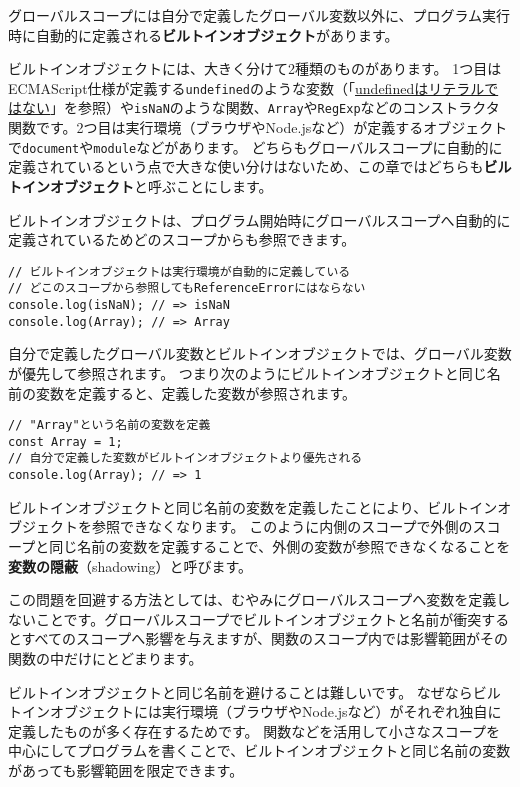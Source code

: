 グローバルスコープには自分で定義したグローバル変数以外に、プログラム実行時に自動的に定義される\textbf{ビルトインオブジェクト}があります。

ビルトインオブジェクトには、大きく分けて2種類のものがあります。
1つ目はECMAScript仕様が定義する\texttt{undefined}のような変数（「\href{../data-type/README.md\#undefined-is-not-literal}{undefinedはリテラルではない}」を参照）や\texttt{isNaN}のような関数、\texttt{Array}や\texttt{RegExp}などのコンストラクタ関数です。2つ目は実行環境（ブラウザやNode.jsなど）が定義するオブジェクトで\texttt{document}や\texttt{module}などがあります。
どちらもグローバルスコープに自動的に定義されているという点で大きな使い分けはないため、この章ではどちらも\textbf{ビルトインオブジェクト}と呼ぶことにします。

ビルトインオブジェクトは、プログラム開始時にグローバルスコープへ自動的に定義されているためどのスコープからも参照できます。

\begin{lstlisting}
// ビルトインオブジェクトは実行環境が自動的に定義している
// どこのスコープから参照してもReferenceErrorにはならない
console.log(isNaN); // => isNaN
console.log(Array); // => Array
\end{lstlisting}

自分で定義したグローバル変数とビルトインオブジェクトでは、グローバル変数が優先して参照されます。
つまり次のようにビルトインオブジェクトと同じ名前の変数を定義すると、定義した変数が参照されます。

\begin{lstlisting}
// "Array"という名前の変数を定義
const Array = 1;
// 自分で定義した変数がビルトインオブジェクトより優先される
console.log(Array); // => 1
\end{lstlisting}

ビルトインオブジェクトと同じ名前の変数を定義したことにより、ビルトインオブジェクトを参照できなくなります。
このように内側のスコープで外側のスコープと同じ名前の変数を定義することで、外側の変数が参照できなくなることを\textbf{変数の隠蔽}（shadowing）と呼びます。

この問題を回避する方法としては、むやみにグローバルスコープへ変数を定義しないことです。グローバルスコープでビルトインオブジェクトと名前が衝突するとすべてのスコープへ影響を与えますが、関数のスコープ内では影響範囲がその関数の中だけにとどまります。

ビルトインオブジェクトと同じ名前を避けることは難しいです。
なぜならビルトインオブジェクトには実行環境（ブラウザやNode.jsなど）がそれぞれ独自に定義したものが多く存在するためです。
関数などを活用して小さなスコープを中心にしてプログラムを書くことで、ビルトインオブジェクトと同じ名前の変数があっても影響範囲を限定できます。

